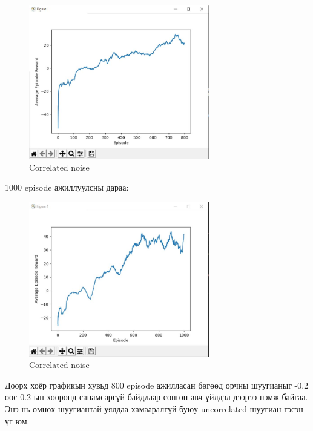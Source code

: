 \documentclass[12pt,A4]{report}
\begin{document}
\begin{figure}[H]
\centering
\includegraphics[width=0.7\textwidth]{./images/after_800_ep}
\caption{Correlated noise}
\end{figure}

1000 episode ажиллуулсны дараа:

\begin{figure}[H]
\centering
\includegraphics[width=0.7\textwidth]{./images/after_1000_ep2}
\caption{Correlated noise}
\end{figure}

Доорх хоёр графикын хувьд 800 episode ажилласан бөгөөд орчны шуугианыг -0.2 оос 0.2-ын хооронд санамсаргүй байдлаар сонгон авч үйлдэл дээрээ нэмж байгаа. Энэ нь өмнөх шуугиантай уялдаа хамааралгүй буюу uncorrelated шуугиан гэсэн үг юм. 
\end{document}
